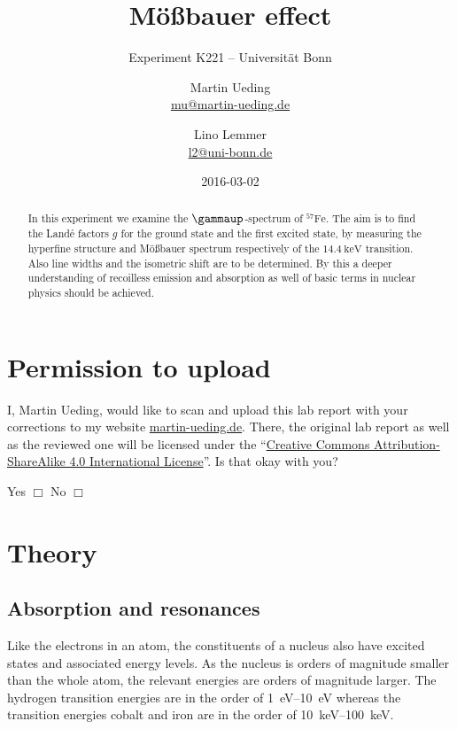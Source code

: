 \documentclass[11pt, english, fleqn, DIV=15, headinclude, BCOR=2cm]{scrreprt}
\title{Mößbauer effect}
\subtitle{Experiment K221 -- Universität Bonn}
\author{%
    Martin Ueding \\
    \small{\href{mailto:mu@martin-ueding.de}{mu@martin-ueding.de}}
    \and
    Lino Lemmer \\
    \small{\href{mailto:l2@uni-bonn.de}{l2@uni-bonn.de}}
}
\date{2016-03-02}
\begin{document}
\maketitle

\begin{abstract}
    In this experiment we examine the $\gammaup$-spectrum of
    $^{57}\mathrm{Fe}$. The aim is to find the Landé factors $g$ for the ground
    state and the first excited state, by measuring the hyperfine structure and
    Mößbauer spectrum respectively of the $\SI{14.4}{\kilo\electronvolt}$
    transition. Also line widths and the isometric shift are to be determined.
    By this a deeper understanding of recoilless emission and absorption as
    well of basic terms in nuclear physics should be achieved.
\end{abstract}

\tableofcontents

\chapter*{Permission to upload}

I, Martin Ueding, would like to scan and upload this lab report with your
corrections to my website \href{http://martin-ueding.de}{martin-ueding.de}.
There, the original lab report as well as the reviewed one will be licensed
under the “\href{http://creativecommons.org/licenses/by-sa/4.0/}{Creative
Commons Attribution-ShareAlike 4.0 International License}”. Is that okay with
you?

Yes $\Box$ \hspace{2cm} No $\Box$

\chapter{Theory}

\section{Absorption and resonances}

Like the electrons in an atom, the constituents of a nucleus also have
excited states and associated energy levels. As the nucleus is orders of
magnitude smaller than the whole atom, the relevant energies are orders of
magnitude larger. The hydrogen transition energies are in the order of
\SIrange{1}{10}{\electronvolt} whereas the transition energies cobalt and iron
are in the order of \SIrange{10}{100}{\kilo\electronvolt}.
\end{document}
